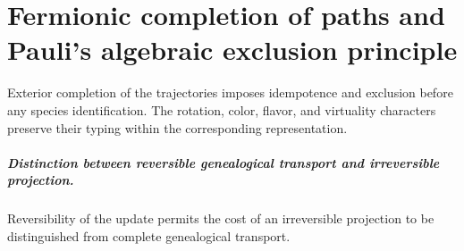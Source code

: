 \chapter{Fermionic completion of paths and Pauli's algebraic exclusion principle}
\label{chap:parte-iv-56}

Exterior completion of the trajectories imposes idempotence and exclusion before any species identification. The rotation, color, flavor, and virtuality characters preserve their typing within the corresponding representation.





\paragraph{Distinction between reversible genealogical transport and irreversible projection.} Reversibility of the update permits the cost of an irreversible projection to be distinguished from complete genealogical transport.
